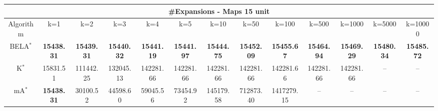 \begin{tabular}{c|cccccccccccc}\toprule
\multicolumn{13}{c}{#Expansions - Maps 15 unit}\\ \midrule
Algorithm & k=1 & k=2 & k=3 & k=4 & k=5 & k=10 & k=50 & k=100 & k=500 & k=1000 & k=5000 & k=10000 \\ \midrule
BELA$^*$ & \textbf{15438.31} & \textbf{15439.31} & \textbf{15440.32} & \textbf{15441.19} & \textbf{15441.97} & \textbf{15444.75} & \textbf{15452.09} & \textbf{15455.67} & \textbf{15464.94} & \textbf{15469.29} & \textbf{15480.34} & \textbf{15485.72} \\
K$^*$ & 15831.51 & 111442.25 & 132045.13 & 142281.66 & 142281.66 & 142281.66 & 142281.66 & 142281.66 & 142281.66 & 142281.66 & -- & -- \\
mA$^*$ & \textbf{15438.31} & 30100.52 & 44598.60 & 59045.56 & 73454.92 & 145179.58 & 712873.40 & 1417279.15 & -- & -- & -- & -- \\ \bottomrule 
\end{tabular}
